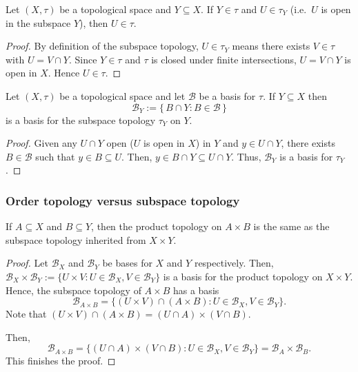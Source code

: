 \begin{lemma}
Let $(X,{\tau})$ be a topological space and $Y\subseteq X$. If $Y\in{\tau}$ and $U\in{\tau}_Y$ (i.e.\ $U$ is open in the subspace $Y$), then $U\in{\tau}$.
\end{lemma}
\begin{proof}
By definition of the subspace topology, $U\in{\tau}_Y$ means there exists $V\in{\tau}$ with $U=V\cap Y$. Since $Y\in{\tau}$ and ${\tau}$ is closed under finite intersections, $U=V\cap Y$ is open in $X$. Hence $U\in{\tau}$.
\end{proof}

\begin{lemma}
Let $(X,{\tau})$ be a topological space and let $\mathcal{B}$ be a basis for ${\tau}$. If $Y\subseteq X$ then
\[
\mathcal{B}_Y:=\{\,B\cap Y : B\in\mathcal{B}\,\}
\]
is a basis for the subspace topology ${\tau}_Y$ on $Y$.
\end{lemma}
\begin{proof}
  Given any $U\cap Y$ open ($U$ is open in $X$) in $Y$ and $y\in U\cap Y$, there exists $B\in\mathcal{B}$ such that $y\in B\subseteq U$. Then, $y\in B\cap Y\subseteq U\cap Y$. Thus, $\mathcal{B}_Y$ is a basis for $\tau_Y$.
\end{proof}

\subsubsection*{Order topology versus subspace topology}

\begin{theorem}
  If $A\subseteq X$ and $B\subseteq Y$, then the product topology on $A\times B$ is the same as the subspace topology inherited from $X\times Y$.
\end{theorem}
\begin{proof}
  Let $\mathcal{B}_X$ and $\mathcal{B}_Y$ be bases for $X$ and $Y$ respectively. Then, $\mathcal{B}_X\times \mathcal{B}_Y:=\{U\times V: U\in\mathcal{B}_X, V\in\mathcal{B}_Y\}$ is a basis for the product topology on $X\times Y$. Hence, the subspace topology of $A\times B$ has a basis
  \[\mathcal{B}_{A\times B}=\{(U\times V)\cap (A\times B): U\in\mathcal{B}_X, V\in\mathcal{B}_Y\}.\]
  Note that $(U\times V)\cap (A\times B) = (U\cap A)\times (V\cap B)$. 

  Then,
  \[
  \mathcal{B}_{A\times B}=\{(U\cap A)\times (V\cap B): U\in\mathcal{B}_X, V\in\mathcal{B}_Y\}=\mathcal{B}_A\times \mathcal{B}_B.
  \]
  This finishes the proof.
\end{proof}



